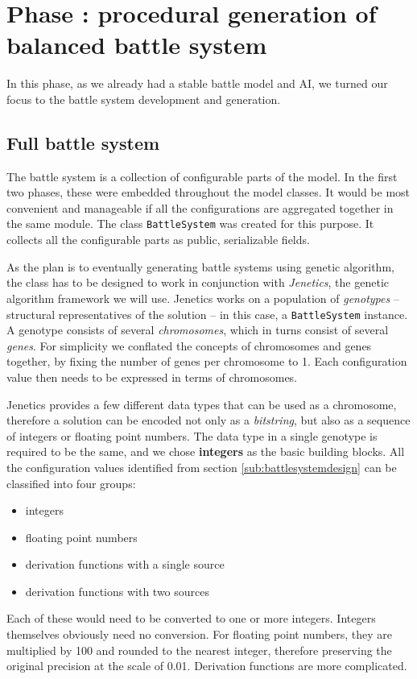 \section{Phase : procedural generation of balanced battle system}

In this phase, as we already had a stable battle model and AI, we turned our focus to the battle system development and generation.

\subsection{Full battle system}

The battle system is a collection of configurable parts of the model. In the first two phases, these were embedded throughout the model classes. It would be most convenient and manageable if all the configurations are aggregated together in the same module. The class \texttt{BattleSystem} was created for this purpose. It collects all the configurable parts as public, serializable fields.

As the plan is to eventually generating battle systems using genetic algorithm, the class has to be designed to work in conjunction with \textit{Jenetics}\cite{holzinger2014interactive}, the genetic algorithm framework we will use. Jenetics works on a population of \textit{genotypes} -- structural representatives of the solution -- in this case, a \texttt{BattleSystem} instance. A genotype consists of several \textit{chromosomes}, which in turns consist of several \textit{genes}. For simplicity we conflated the concepts of chromosomes and genes together, by fixing the number of genes per chromosome to 1. Each configuration value then needs to be expressed in terms of chromosomes.

Jenetics provides a few different data types that can be used as a chromosome, therefore a solution can be encoded not only as a \textit{bitstring}, but also as a sequence of integers or floating point numbers. The data type in a single genotype is required to be the same\cite[6]{jenetics-manual}, and we chose \textbf{integers} as the basic building blocks. All the configuration values identified from section \ref{sub:battlesystemdesign} can be classified into four groups:
\begin{itemize}
	\item integers
	\item floating point numbers
	\item derivation functions with a single source
	\item derivation functions with two sources
\end{itemize}
Each of these would need to be converted to one or more integers. Integers themselves obviously need no conversion. For floating point numbers, they are multiplied by 100 and rounded to the nearest integer, therefore preserving the original precision at the scale of 0.01. Derivation functions are more complicated.


